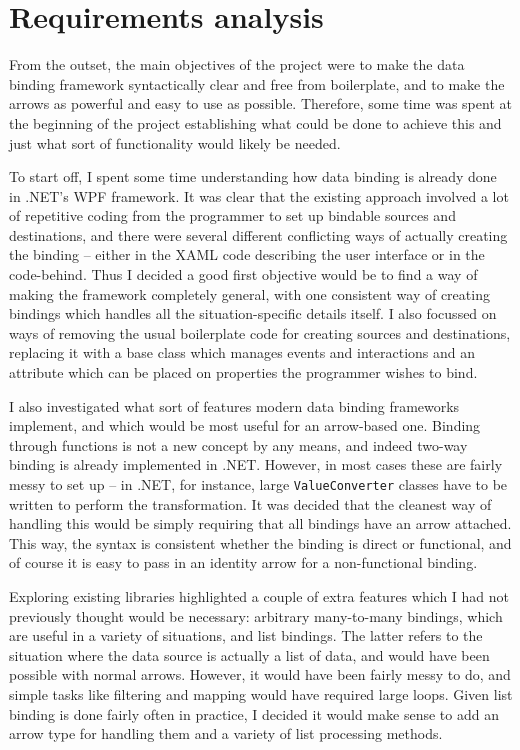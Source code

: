 \documentclass[12pt,twoside,notitlepage]{report}
\begin{document}
\section{Requirements analysis}

From the outset, the main objectives of the project were to make the data binding framework syntactically clear and free from boilerplate, and to make the arrows as powerful and easy to use as possible. Therefore, some time was spent at the beginning of the project establishing what could be done to achieve this and just what sort of functionality would likely be needed.

To start off, I spent some time understanding how data binding is already done in .NET's WPF framework. It was clear that the existing approach involved a lot of repetitive coding from the programmer to set up bindable sources and destinations, and there were several different conflicting ways of actually creating the binding -- either in the XAML code describing the user interface or in the code-behind. Thus I decided a good first objective would be to find a way of making the framework completely general, with one consistent way of creating bindings which handles all the situation-specific details itself. I also focussed on ways of removing the usual boilerplate code for creating sources and destinations, replacing it with a base class which manages events and interactions and an attribute which can be placed on properties the programmer wishes to bind.

I also investigated what sort of features modern data binding frameworks implement, and which would be most useful for an arrow-based one. Binding through functions is not a new concept by any means, and indeed two-way binding is already implemented in .NET. However, in most cases these are fairly messy to set up -- in .NET, for instance, large \texttt{ValueConverter} classes have to be written to perform the transformation. It was decided that the cleanest way of handling this would be simply requiring that all bindings have an arrow attached. This way, the syntax is consistent whether the binding is direct or functional, and of course it is easy to pass in an identity arrow for a non-functional binding.

Exploring existing libraries highlighted a couple of extra features which I had not previously thought would be necessary: arbitrary many-to-many bindings, which are useful in a variety of situations, and list bindings. The latter refers to the situation where the data source is actually a list of data, and would have been possible with normal arrows. However, it would have been fairly messy to do, and simple tasks like filtering and mapping would have required large loops. Given list binding is done fairly often in practice, I decided it would make sense to add an arrow type for handling them and a variety of list processing methods.
\end{document}
